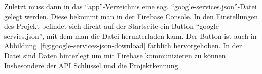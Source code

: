 Zuletzt muss dann in das \enquote{app}-Verzeichnis eine sog. \enquote{google-services.json}-Datei gelegt werden. Diese bekommt man in der Firebase Console. In den Einstellungen des Projekt befindet sich direkt auf der Startseite ein Button \enquote{google-servies.json}, mit dem man die Datei herunterladen kann. Der Button ist auch in Abbildung~\ref{fig:google-services-json-download} farblich hervorgehoben. In der Datei sind Daten hinterlegt um mit Firebase kommunizieren zu können. Insbesondere der API Schlüssel und die Projektkennung.